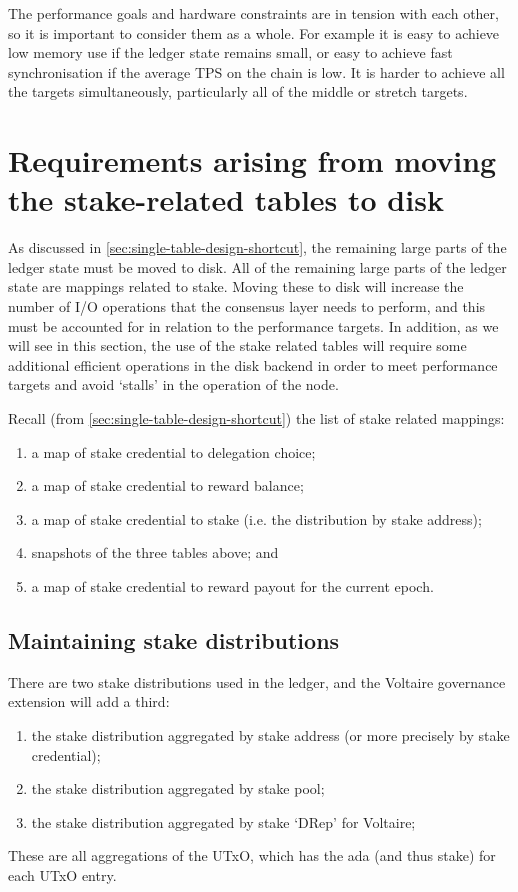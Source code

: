 \documentclass[11pt,a4paper]{article}
\begin{document}
The performance goals and hardware constraints are in tension with each other,
so it is important to consider them as a whole. For example it is easy to
achieve low memory use if the ledger state remains small, or easy to achieve
fast synchronisation if the average TPS on the chain is low. It is harder to
achieve all the targets simultaneously, particularly all of the middle or
stretch targets.

\section{Requirements arising from moving the stake-related tables to disk}
\label{sec:requirements-for-storing-the-stake-related-tables-on-disk}

As discussed in \cref{sec:single-table-design-shortcut}, the remaining large
parts of the ledger state must be moved to disk. All of the remaining large
parts of the ledger state are mappings related to stake. Moving these to disk
will increase the number of I/O operations that the consensus layer needs to
perform, and this must be accounted for in relation to the performance targets.
In addition, as we will see in this section, the use of the stake related
tables will require some additional efficient operations in the disk backend
in order to meet performance targets and avoid `stalls' in the operation of the
node.

Recall (from \cref{sec:single-table-design-shortcut}) the list of stake related
mappings:
\begin{enumerate}
\item a map of stake credential to delegation choice;
\item a map of stake credential to reward balance;
\item a map of stake credential to stake (i.e. the distribution by stake address);
\item snapshots of the three tables above; and
\item a map of stake credential to reward payout for the current epoch.
\end{enumerate}

\subsection{Maintaining stake distributions}

There are two stake distributions used in the ledger, and the Voltaire
governance extension will add a third:
\begin{enumerate}
\item the stake distribution aggregated by stake address (or more precisely by
      stake credential);
\item the stake distribution aggregated by stake pool;
\item the stake distribution aggregated by stake `DRep' for Voltaire;
\end{enumerate}
These are all aggregations of the UTxO, which has the ada (and thus stake) for
each UTxO entry.
\end{document}
